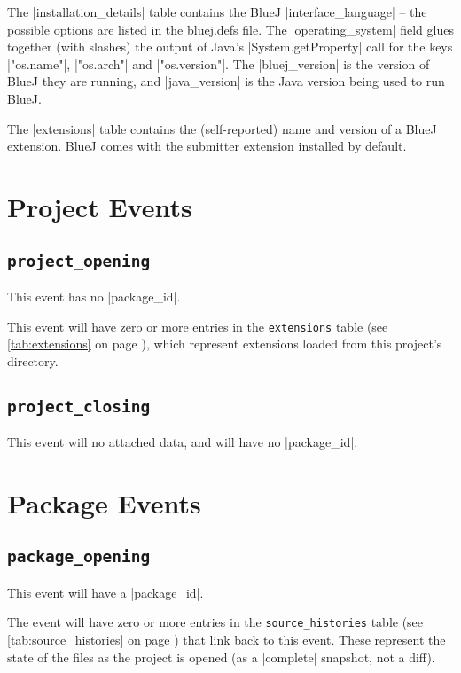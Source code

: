 \documentclass{book}
\newcommand{\myref}[1]{\autoref{#1} on page \pageref*{#1}}
\newcommand{\tabref}[1]{\lstinline|#1| table (see \myref{tab:#1})}
\begin{document}
The |installation_details| table contains the BlueJ |interface_language| -- the
possible options are listed in the bluej.defs file.  The |operating_system|
field glues together (with slashes) the output of Java's |System.getProperty|
call for the keys |"os.name"|, |"os.arch"| and |"os.version"|.  The
|bluej_version| is the version of BlueJ they are running, and |java_version|
is the Java version being used to run BlueJ.


The |extensions| table contains the (self-reported) name and version of a
BlueJ extension.  BlueJ comes with the submitter extension installed by default.


\section{Project Events}

\subsection{\lstinline|project_opening|}

This event has no |package_id|.

This event will have zero or more entries in the \tabref{extensions}, which
represent extensions loaded from this project's directory.

\subsection{\lstinline|project_closing|}

This event will no attached data, and will have no |package_id|.


\section{Package Events}

\subsection{\lstinline|package_opening|}

This event will have a |package_id|.

The event will have zero or more entries in the \tabref{source_histories} that
link back to this event.  These represent the state of the files as the project is
opened (as a |complete| snapshot, not a diff).
\end{document}
